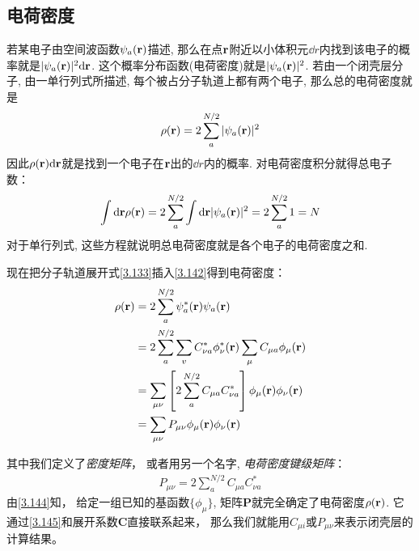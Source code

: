 \subsection{电荷密度}
若某电子由空间波函数$\psi_a(\mathbf{r})$描述, 
那么在点$\mathbf{r}$附近以小体积元$\dd{r}$内找到该电子的概率就是$|\psi_a(\bfr)|^2\dd{r}$. 
这个概率分布函数(电荷密度)就是$|\psi_a(\mathbf{r})|^2$. 
若由一个闭壳层分子, 
由一单行列式所描述, 
每个被占分子轨道上都有两个电子, 
那么总的电荷密度就是
\begin{align}
	\label{3.142}
	\rho(\mathbf{r}) = 2 \sum_{a}^{N/2} |\psi_a(\mathbf{r})|^2
\end{align}
因此$\rho(\bfr)\dd{r}$就是找到一个电子在$\mathbf{r}$出的$\dd{r}$内的概率. 
对电荷密度积分就得总电子数：
\begin{align}
	\int\dd{r}\rho(\bfr) = 2 \sum_{a}^{N/2} \int\dd{r}|\psi_a(\bfr)|^2 = 2\sum_{a}^{N/2}1=N
\end{align}
对于单行列式, 
这些方程就说明总电荷密度就是各个电子的电荷密度之和.


现在把分子轨道展开式\eqref{3.133}插入\eqref{3.142}得到电荷密度：
\begin{align}
	\rho(\mathbf{r}) & = 2\sum_{a}^{N/2}\psi_a^*(\mathbf{r})\psi_a(\mathbf{r}) \notag\\
	& = 2\sum_{a}^{N/2}\sum_{v} C_{\nu a}^*\phi_\nu^*(\mathbf{r})\sum_{\mu}C_{\mu a}\phi_\mu(\mathbf{r}) \notag\\
	& = \sum_{\mu\nu}\left[ 2\sum_{a}^{N/2}C_{\mu a}C_{\nu a}^* \right]\phi_\mu(\mathbf{r})\phi_\nu(\mathbf{r}) \notag\\
	& = \sum_{\mu\nu}P_{\mu\nu} \phi_\mu(\mathbf{r})\phi_\nu(\mathbf{r})
	\label{3.144}
\end{align}

其中我们定义了\emph{密度矩阵}，
或者用另一个名字, 
\emph{电荷密度键级矩阵}：
\begin{align}
	P_{\mu\nu} = 2\sum_{a}^{N/2}C_{\mu a}C_{\nu a}^*
	\label{3.145}
\end{align}
由\eqref{3.144}知，
给定一组已知的基函数$\{\phi_\mu\}$, 
矩阵$\mathbf{P}$就完全确定了电荷密度$\rho(\mathbf{r})$. 
它通过\eqref{3.145}和展开系数$\mathbf{C}$直接联系起来，
那么我们就能用$C_{\mu i}$或$P_{\mu\nu}$来表示闭壳层\hft 的计算结果。


